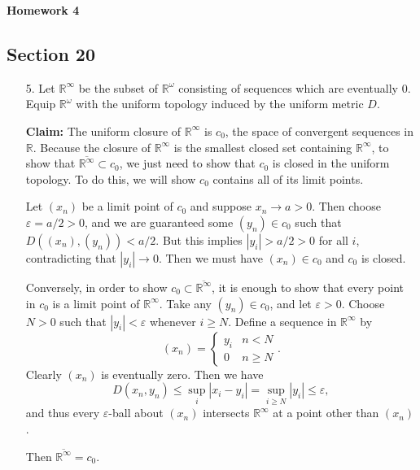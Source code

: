 \documentclass[11pt, reqno]{article}
\theoremstyle{plain}
\theoremstyle{definition}
\theoremstyle{remark}
\renewcommand{\epsilon}{\varepsilon}
\newcommand{\RR}{\mathbb{R}}
\begin{document}
\topmargin=-40pt
\renewcommand{\headrulewidth}{1pt}
\renewcommand{\headsep}{20pt}
\thispagestyle{fancy}

{\Huge \bfseries \noindent Homework 4}

\subsection*{Section 20}
\begin{enumerate}
    \item[5.] Let $\RR^\infty$ be the subset of $\RR^\omega$ consisting of sequences which
    are eventually $0$. Equip $\RR^\omega$ with the uniform topology induced by the 
    uniform metric $D$.

    \textbf{Claim:} The uniform closure of $\RR^\infty$ is $c_0$, the space of convergent 
    sequences in $\RR$.
    \bigbreak
    Because the closure of $\RR^\infty$ is the smallest closed set containing $\RR^\infty$, 
    to show that $\overline{\RR^\infty} \subset c_0$, we just need to show that $c_0$ is 
    closed in the uniform topology. To do this, we will show $c_0$ contains all of its 
    limit points. 

    Let $(x_n)$ be a limit point of $c_0$ and suppose $x_n \rightarrow a > 0$. Then choose $\epsilon = a/2 > 0$, and 
    we are guaranteed some $(y_n) \in c_0$ such that $D((x_n), (y_n)) < a/2$. But this implies $|y_i| > a/2 > 0$ for 
    all $i$, contradicting that $|y_i| \rightarrow 0$. Then we must have $(x_n) \in c_0$ and $c_0$ is closed.

    Conversely, in order to show $c_0 \subset \overline{\RR^\infty}$, it is enough to show that every point 
    in $c_0$ is a limit point of $\RR^\infty$. Take any $(y_n) \in c_0$, and let $\epsilon > 0$. Choose 
    $N > 0$ such that $|y_i| < \epsilon$ whenever $i \geq N$. Define a sequence in $\RR^\infty$ by
    \[
        (x_n) = \begin{cases} y_i & n < N\\ 0 & n \geq N\end{cases}.
    \]
    Clearly $(x_n)$ is eventually zero. 
    Then we have 
    \[
        D(x_n, y_n) \leq \sup\limits_i |x_i - y_i| = \sup\limits_{i \geq N} |y_i| \leq \epsilon,
    \]
    and thus every $\epsilon$-ball about $(x_n)$ intersects $\RR^\infty$ at a point other than $(x_n)$.

    Then $\overline{\RR^\infty} = c_0$.


\end{enumerate}
\end{document}
